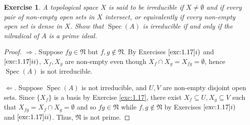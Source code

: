 \documentclass[12pt,letterpaper]{article}
\newtheorem{problem}{Exercise}[section]
\theoremstyle{definition}
\theoremstyle{remark}
\numberwithin{figure}{problem}
\numberwithin{equation}{section}
\DeclareMathOperator{\Spec}{Spec}
\begin{document}
\begin{problem}\label{exc:1.19}
  A topological space $X$ is said to be \emph{irreducible} if $X \ne \emptyset$ and if every pair of non-empty open sets in $X$ intersect, or equivalently if every non-empty open set is dense in $X$. Show that $\Spec(A)$ is irreducible if and only if the nilradical of $A$ is a prime ideal.
\end{problem}
\begin{proof}
  $\Rightarrow$. Suppose $fg \in \mathfrak{N}$ but $f,g \notin \mathfrak{N}$. By Exercises $\ref{exc:1.17}i)$ and $\ref{exc:1.17}ii)$, $X_f,X_g$ are non-empty even though $X_f \cap X_g = X_{fg} = \emptyset$, hence $\Spec(A)$ is not irreducible.
  \par $\Leftarrow$. Suppose $\Spec(A)$ is not irreducible, and $U,V$ are non-empty disjoint open sets. Since $\{X_f\}$ is a basis by Exercise \ref{exc:1.17}, there exist $X_f \subseteq U,X_g \subseteq V$ such that $X_{fg} = X_f \cap X_g = \emptyset$ and so $fg \in \mathfrak{N}$ while $f,g \notin \mathfrak{N}$ by Exercises $\ref{exc:1.17}i)$ and $\ref{exc:1.17}ii)$. Thus, $\mathfrak{N}$ is not prime.
\end{proof}
\end{document}
